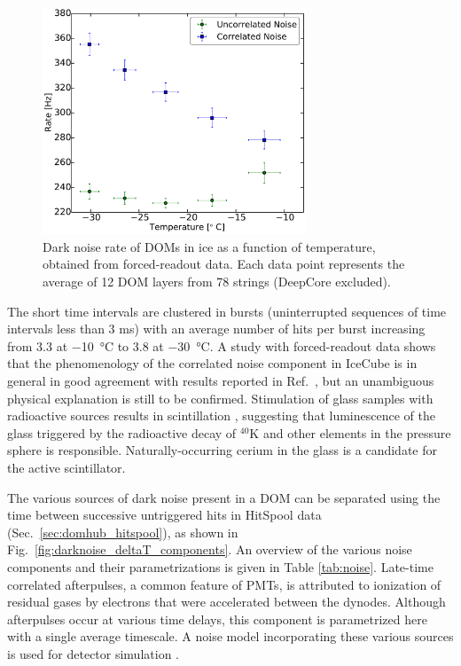 \begin{figure}
  \centering
  \includegraphics[width=0.7\textwidth]{graphics/dom/performance/darknoise/HitRatevsTemp_inice_nomuons_nofit_bigfont.pdf}
  \caption{Dark noise rate of DOMs in ice as a function of temperature, obtained from forced-readout
    data. Each data point represents the average of 12 DOM layers from 78 strings (DeepCore excluded).}
  \label{fig:dom_darknoise_vs_temperature}
\end{figure}

The short time intervals are clustered in bursts (uninterrupted sequences
of time intervals less than 3 ms) with an average number of
hits per burst increasing from \num{3.3} at \SI{-10}{\celsius} to \num{3.8} at
\SI{-30}{\celsius}. A study with forced-readout data shows that the
phenomenology of the correlated noise component in IceCube is in general in
good agreement with results reported in Ref.~\cite{meyer_noise}, but an
unambiguous physical explanation is still to be confirmed.  Stimulation of
glass samples with radioactive sources results in scintillation
\cite{helbing_glass}, suggesting that luminescence of the glass triggered
by the radioactive decay of $^{40}\mathrm{K}$ and other elements in the
pressure sphere is responsible.  Naturally-occurring cerium in the glass is
a candidate for the active scintillator. 

The various sources of dark noise present in a DOM can be separated using
the time between successive untriggered hits in HitSpool 
data (Sec.~\ref{sec:domhub_hitspool}), as shown in 
Fig.~\ref{fig:darknoise_deltaT_components}. An overview of the various 
noise components and their parametrizations is given in Table \ref{tab:noise}.  Late-time
correlated afterpulses, a common feature of PMTs, is attributed to
ionization of residual gases by electrons that were accelerated between
the dynodes.  Although afterpulses occur at various time delays, this
component is parametrized here with a single average timescale.  A
noise model incorporating these various sources is used for detector
simulation \cite{larson2013simulation}. 


